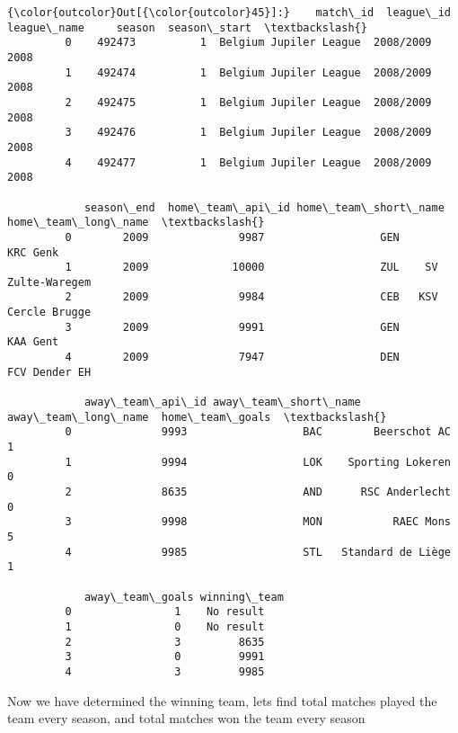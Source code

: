 \documentclass[11pt]{article}
\begin{document}
\begin{Verbatim}[commandchars=\\\{\}]
{\color{outcolor}Out[{\color{outcolor}45}]:}    match\_id  league\_id             league\_name     season  season\_start  \textbackslash{}
         0    492473          1  Belgium Jupiler League  2008/2009          2008   
         1    492474          1  Belgium Jupiler League  2008/2009          2008   
         2    492475          1  Belgium Jupiler League  2008/2009          2008   
         3    492476          1  Belgium Jupiler League  2008/2009          2008   
         4    492477          1  Belgium Jupiler League  2008/2009          2008   
         
            season\_end  home\_team\_api\_id home\_team\_short\_name home\_team\_long\_name  \textbackslash{}
         0        2009              9987                  GEN            KRC Genk   
         1        2009             10000                  ZUL    SV Zulte-Waregem   
         2        2009              9984                  CEB   KSV Cercle Brugge   
         3        2009              9991                  GEN            KAA Gent   
         4        2009              7947                  DEN       FCV Dender EH   
         
            away\_team\_api\_id away\_team\_short\_name away\_team\_long\_name  home\_team\_goals  \textbackslash{}
         0              9993                  BAC        Beerschot AC                1   
         1              9994                  LOK    Sporting Lokeren                0   
         2              8635                  AND      RSC Anderlecht                0   
         3              9998                  MON           RAEC Mons                5   
         4              9985                  STL   Standard de Liège                1   
         
            away\_team\_goals winning\_team  
         0                1    No result  
         1                0    No result  
         2                3         8635  
         3                0         9991  
         4                3         9985  
\end{Verbatim}
            
    Now we have determined the winning team, lets find total matches played
the team every season, and total matches won the team every season
\end{document}

